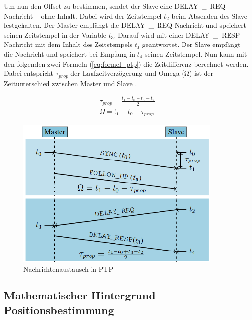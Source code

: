 Um nun den Offset zu bestimmen, sendet der Slave eine \si{DELAY\_REQ}-Nachricht -- ohne Inhalt. Dabei wird der Zeitstempel $t_{2}$ beim Absenden des Slave festgehalten. Der Master empfängt die \si{DELAY\_REQ}-Nachricht und speichert seinen Zeitstempel in der Variable $t_{3}$. Darauf wird mit einer \si{DELAY\_RESP}-Nachricht mit dem Inhalt des Zeitstempels $t_{3}$ geantwortet. Der Slave empfängt die Nachricht und speichert bei Empfang in $t_{4}$ seinen Zeitstempel. Nun kann mit den folgenden zwei Formeln (\ref{eq:formel_ptp}) die Zeitdifferenz berechnet werden. Dabei entspricht $\tau_{prop}$ der Laufzeitverzögerung und Omega (\si{\ohm}) ist der Zeitunterschied zwischen Master und Slave \cite{src_PTP}.

\begin{equation}\label{eq:formel_ptp}
\begin{split}
\tau_{prop} = \frac{t_{1} - t_{0} + t_{3} - t_{2}}{2}
\\
\Omega = t_{1} - t_{0} - \tau_{prop}
\end{split}
\end{equation}

\begin{figure}[H]
        \centering
        \includegraphics[width=0.9\textwidth]{images/ptp.png}
        \caption{Nachrichtenaustausch in PTP}
        \label{img:ptp}
\end{figure}

\subsection{Mathematischer Hintergrund -- Positionsbestimmung}

